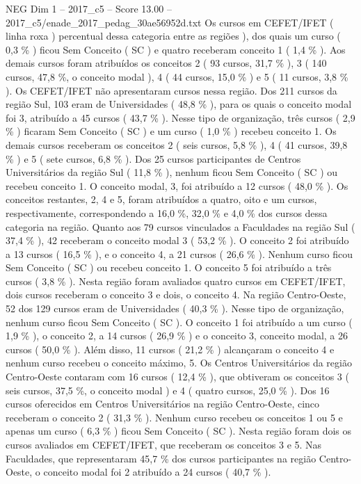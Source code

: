 \begin{textsample}{NEG Dim 1 – 2017\_c5 – Score 13.00 – 2017\_c5/enade\_2017\_pedag\_30ae56952d.txt}
Os cursos em CEFET/IFET ( linha roxa ) percentual dessa categoria entre as regiões ), dos quais um curso ( 0,3 \% ) ficou Sem Conceito ( SC ) e quatro receberam conceito 1 ( 1,4 \% ).
Aos demais cursos foram atribuídos os conceitos 2 ( 93 cursos, 31,7 \% ), 3 ( 140 cursos, 47,8 \%, o conceito modal ), 4 ( 44 cursos, 15,0 \% ) e 5 ( 11 cursos, 3,8 \% ).
Os CEFET/IFET não apresentaram cursos nessa região.
Dos 211 cursos da região Sul, 103 eram de Universidades ( 48,8 \% ), para os quais o conceito modal foi 3, atribuído a 45 cursos ( 43,7 \% ).
Nesse tipo de organização, três cursos ( 2,9 \% ) ficaram Sem Conceito ( SC ) e um curso ( 1,0 \% ) recebeu conceito 1.
Os demais cursos receberam os conceitos 2 ( seis cursos, 5,8 \% ), 4 ( 41 cursos, 39,8 \% ) e 5 ( sete cursos, 6,8 \% ).
Dos 25 cursos participantes de Centros Universitários da região Sul ( 11,8 \% ), nenhum ficou Sem Conceito ( SC ) ou recebeu conceito 1.
O conceito modal, 3, foi atribuído a 12 cursos ( 48,0 \% ).
Os conceitos restantes, 2, 4 e 5, foram atribuídos a quatro, oito e um cursos, respectivamente, correspondendo a 16,0 \%, 32,0 \% e 4,0 \% dos cursos dessa categoria na região.
Quanto aos 79 cursos vinculados a Faculdades na região Sul ( 37,4 \% ), 42 receberam o conceito modal 3 ( 53,2 \% ).
O conceito 2 foi atribuído a 13 cursos ( 16,5 \% ), e o conceito 4, a 21 cursos ( 26,6 \% ).
Nenhum curso ficou Sem Conceito ( SC ) ou recebeu conceito 1.
O conceito 5 foi atribuído a três cursos ( 3,8 \% ).
Nesta região foram avaliados quatro cursos em CEFET/IFET, dois cursos receberam o conceito 3 e dois, o conceito 4.
Na região Centro-Oeste, 52 dos 129 cursos eram de Universidades ( 40,3 \% ).
Nesse tipo de organização, nenhum curso ficou Sem Conceito ( SC ).
O conceito 1 foi atribuído a um curso ( 1,9 \% ), o conceito 2, a 14 cursos ( 26,9 \% ) e o conceito 3, conceito modal, a 26 cursos ( 50,0 \% ).
Além disso, 11 cursos ( 21,2 \% ) alcançaram o conceito 4 e nenhum curso recebeu o conceito máximo, 5.
Os Centros Universitários da região Centro-Oeste contaram com 16 cursos ( 12,4 \% ), que obtiveram os conceitos 3 ( seis cursos, 37,5 \%, o conceito modal ) e 4 ( quatro cursos, 25,0 \% ).
Dos 16 cursos oferecidos em Centros Universitários na região Centro-Oeste, cinco receberam o conceito 2 ( 31,3 \% ).
Nenhum curso recebeu os conceitos 1 ou 5 e apenas um curso ( 6,3 \% ) ficou Sem Conceito ( SC ).
Nesta região foram dois os cursos avaliados em CEFET/IFET, que receberam os conceitos 3 e 5.
Nas Faculdades, que representaram 45,7 \% dos cursos participantes na região Centro-Oeste, o conceito modal foi 2 atribuído a 24 cursos ( 40,7 \% ).

\end{textsample}
